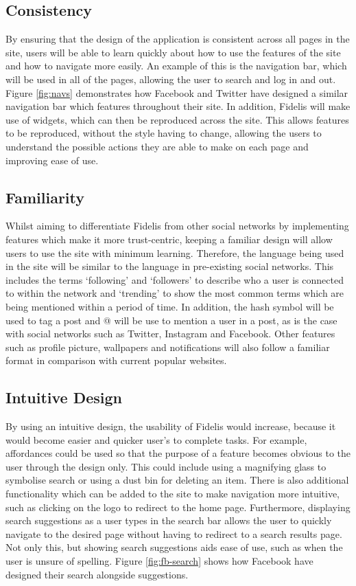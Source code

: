\subsection{Consistency}
By ensuring that the design of the application is consistent across all pages in the site, users will be able to learn quickly about how to use the features of the site and how to navigate more easily. An example of this is the navigation bar, which will be used in all of the pages, allowing the user to search and log in and out. Figure \ref{fig:navs} demonstrates how Facebook and Twitter have designed a similar navigation bar which features throughout their site. In addition, Fidelis will make use of widgets, which can then be reproduced across the site. This allows features to be reproduced, without the style having to change, allowing the users to understand the possible actions they are able to make on each page and improving ease of use.

\subsection{Familiarity}
Whilst aiming to differentiate Fidelis from other social networks by implementing features which make it more trust-centric, keeping a familiar design will allow users to use the site with minimum learning. Therefore, the language being used in the site will be similar to the language in pre-existing social networks. This includes the terms `following' and `followers' to describe who a user is connected to within the network and `trending' to show the most common terms which are being mentioned within a period of time. In addition, the hash symbol will be used to tag a post and @ will be use to mention a user in a post, as is the case with social networks such as Twitter, Instagram and Facebook. Other features such as profile picture, wallpapers and notifications will also follow a familiar format in comparison with current popular websites.

\subsection{Intuitive Design}
By using an intuitive design, the usability of Fidelis would increase, because it would become easier and quicker user's to complete tasks. For example, affordances could be used so that the purpose of a feature becomes obvious to the user through the design only. This could include using a magnifying glass to symbolise search or using a dust bin for deleting an item. There is also additional functionality which can be added to the site to make navigation more intuitive, such as clicking on the logo to redirect to the home page. Furthermore, displaying search suggestions as a user types in the search bar allows the user to quickly navigate to the desired page without having to redirect to a search results page. Not only this, but showing search suggestions aids ease of use, such as when the user is unsure of spelling. Figure \ref{fig:fb-search} shows how Facebook have designed their search alongside suggestions.


